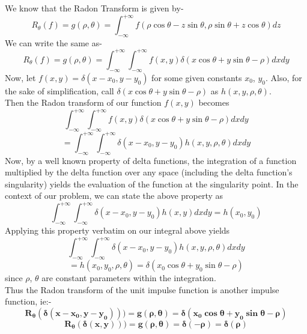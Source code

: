 \documentclass[a4paper,11pt]{article}
\numberwithin{definition}{section}
\numberwithin{mytheorem}{subsection}
\begin{document}
We know that the Radon Transform is given by-
$$R_\theta(f) =g(\rho, \theta)= \int_{-\infty}^{+\infty}f(\rho \cos\theta - z\sin\theta,\rho \sin \theta + z \cos\theta)dz $$
We can write the same as-
$$R_\theta(f) =g(\rho, \theta)= \int_{-\infty}^{+\infty}\int_{-\infty}^{+\infty}f(x,y)\delta(x\cos\theta+y\sin\theta -\rho)dxdy $$
Now, let $f(x, y) = \delta(x-x_0, y-y_0)$ for some given constants $x_0$, $y_0$. Also, for the sake of simplification, call $\delta(x\cos\theta+y\sin\theta -\rho)$ as $h(x, y, \rho, \theta)$.\\
Then the Radon transform of our function $f(x,y)$ becomes
$$\int_{-\infty}^{+\infty}\int_{-\infty}^{+\infty}f(x,y)\delta(x\cos\theta+y\sin\theta -\rho)dxdy$$
$$ = \int_{-\infty}^{+\infty}\int_{-\infty}^{+\infty}\delta(x-x_0, y-y_0)h(x,y,\rho,\theta)dxdy$$
Now, by a well known property of delta functions, the integration of a function multiplied by the delta function over any space (including the delta function's singularity) yields the evaluation of the function at the singularity point. In the context of our problem, we can state the above property as 
$$\int_{-\infty}^{+\infty}\int_{-\infty}^{+\infty}\delta(x-x_0, y-y_0)h(x,y)dxdy = h(x_0, y_0)$$
Applying this property verbatim on our integral above yields
$$\int_{-\infty}^{+\infty}\int_{-\infty}^{+\infty}\delta(x-x_0, y-y_0)h(x,y,\rho,\theta)dxdy$$
$$ = h(x_0, y_0, \rho, \theta) = \delta(x_0\cos\theta+y_0\sin\theta -\rho)$$
since $\rho$, $\theta$ are constant parameters within the integration.\\
Thus the Radon transform of the unit impulse function is another impulse function, ie:-
$$\boldsymbol{R_{\theta}(\delta(x-x_0, y-y_0))) = g(\rho, \theta) = \delta(x_0\cos\theta+y_0\sin\theta -\rho)}$$
$$\boldsymbol{R_{\theta}(\delta(x, y))) = g(\rho, \theta) = \delta(-\rho) = \delta(\rho)}$$
\end{document}
